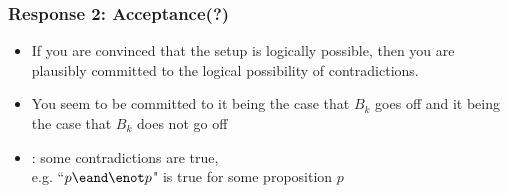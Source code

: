 \begin{frame}
\frametitle{Response 2: Acceptance(?)}

\begin{itemize}[<+->]

\item If you are convinced that the setup is logically possible, then you are plausibly committed to the logical possibility of contradictions.

\item You seem to be committed to it being the case that $B_k$ goes off and it being the case that $B_k$ does not go off 

\item {}: some contradictions are true, \\ e.g. ``$p \eand \enot p$" is true for some proposition $p$


\end{itemize}
\end{frame}

